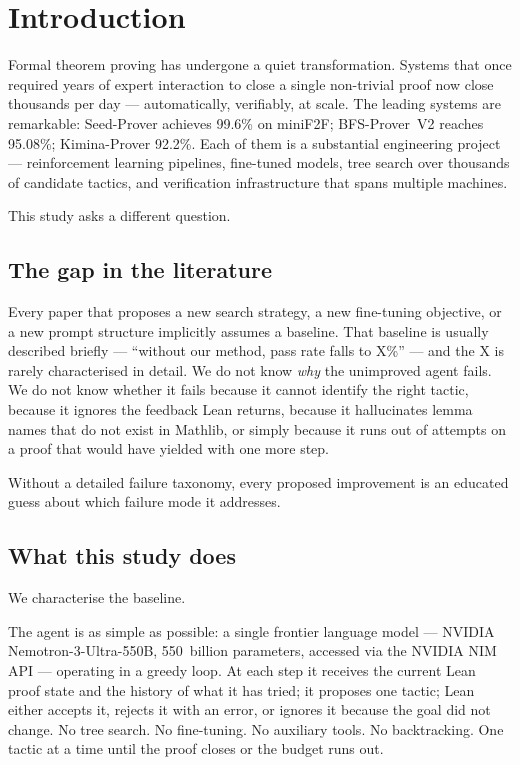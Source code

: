 \chapter{Introduction}
\label{chap:introduction}

Formal theorem proving has undergone a quiet transformation.
Systems that once required years of expert interaction to close a single non-trivial proof
now close thousands per day --- automatically, verifiably, at scale.
The leading systems are remarkable: Seed-Prover achieves 99.6\% on miniF2F;
BFS-Prover~V2 reaches 95.08\%; Kimina-Prover 92.2\%.
Each of them is a substantial engineering project --- reinforcement learning pipelines,
fine-tuned models, tree search over thousands of candidate tactics,
and verification infrastructure that spans multiple machines.

This study asks a different question.

\section{The gap in the literature}

Every paper that proposes a new search strategy, a new fine-tuning objective,
or a new prompt structure implicitly assumes a baseline.
That baseline is usually described briefly --- ``without our method, pass rate falls to X\%'' ---
and the X is rarely characterised in detail.
We do not know \emph{why} the unimproved agent fails.
We do not know whether it fails because it cannot identify the right tactic,
because it ignores the feedback Lean returns, because it hallucinates lemma names
that do not exist in Mathlib, or simply because it runs out of attempts on a proof
that would have yielded with one more step.

Without a detailed failure taxonomy, every proposed improvement is an educated guess
about which failure mode it addresses.

\section{What this study does}

We characterise the baseline.

The agent is as simple as possible: a single frontier language model ---
NVIDIA Nemotron-3-Ultra-550B, 550~billion parameters, accessed via the NVIDIA NIM API ---
operating in a greedy loop.
At each step it receives the current Lean proof state and the history of what it has tried;
it proposes one tactic; Lean either accepts it, rejects it with an error, or ignores it
because the goal did not change.
No tree search.
No fine-tuning.
No auxiliary tools.
No backtracking.
One tactic at a time until the proof closes or the budget runs out.

